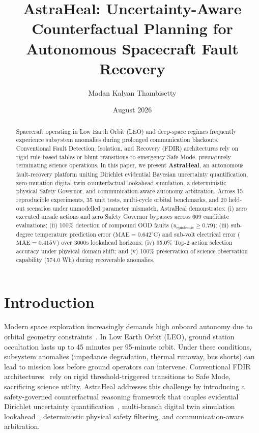 \documentclass[journal]{article}
\title{\textbf{AstraHeal: Uncertainty-Aware Counterfactual Planning for Autonomous Spacecraft Fault Recovery}}
\author[1]{Madan Kalyan Thambisetty}
\affil[1]{Autonomous Systems \& Aerospace Research Platform}
\affil[ ]{\url{https://github.com/madankalyan2211/AstraHeal}}
\date{August 2026}
\begin{document}
\maketitle

\begin{abstract}
Spacecraft operating in Low Earth Orbit (LEO) and deep-space regimes frequently experience subsystem anomalies during prolonged communication blackouts. Conventional Fault Detection, Isolation, and Recovery (FDIR) architectures rely on rigid rule-based tables or blunt transitions to emergency Safe Mode, prematurely terminating science operations. In this paper, we present \textbf{AstraHeal}, an autonomous fault-recovery platform uniting Dirichlet evidential Bayesian uncertainty quantification, zero-mutation digital twin counterfactual lookahead simulation, a deterministic physical Safety Governor, and communication-aware autonomy arbitration. Across 15 reproducible experiments, 35 unit tests, multi-cycle orbital benchmarks, and 20 held-out scenarios under unmodelled parameter mismatch, AstraHeal demonstrates: (i) zero executed unsafe actions and zero Safety Governor bypasses across 609 candidate evaluations; (ii) 100\% detection of compound OOD faults ($u_{\text{epistemic}} \ge 0.79$); (iii) sub-degree temperature prediction error ($\text{MAE} = 0.642^\circ\text{C}$) and sub-volt electrical error ($\text{MAE} = 0.415\text{V}$) over 3000s lookahead horizons; (iv) 95.0\% Top-2 action selection accuracy under physical domain shift; and (v) 100\% preservation of science observation capability (574.0 Wh) during recoverable anomalies.
\end{abstract}

\section{Introduction}
Modern space exploration increasingly demands high onboard autonomy due to orbital geometry constraints~\cite{chien2005autonomous}. In Low Earth Orbit (LEO), ground station occultation lasts up to 45 minutes per 95-minute orbit. Under these conditions, subsystem anomalies (impedance degradation, thermal runaway, bus shorts) can lead to mission loss before ground operators can intervene. Conventional FDIR architectures~\cite{muscettola1998remote, williams2003model} rely on rigid threshold-triggered transitions to Safe Mode, sacrificing science utility. AstraHeal addresses this challenge by introducing a safety-governed counterfactual reasoning framework that couples evidential Dirichlet uncertainty quantification~\cite{sensoy2018evidential}, multi-branch digital twin simulation lookahead~\cite{grieves2017digital, wright2020digital}, deterministic physical safety filtering, and communication-aware arbitration.
\end{document}
